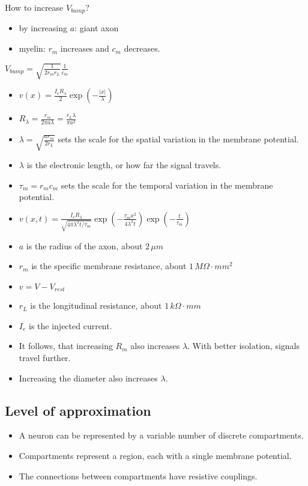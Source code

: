 \documentclass[main]{subfiles}
\begin{document}
How to increase $V_{bump}$?
\begin{itemize}
\item by increasing $a$: giant axon
\item myelin: $r_m$ increases and $c_m$ decreases.
\end{itemize}

$V_{bump} = \sqrt{\frac{1}{2 r_m r_L}} \frac{1}{c_m}$

\begin{itemize}[noitemsep,nolistsep]
	\item $v(x) = \frac{I_eR_\lambda}{2}\exp(-\frac{|x|}{\lambda})$
	\item $R_\lambda=\frac{r_m}{2\pi a\lambda} = \frac{r_L\lambda}{\pi a^2}$
	\item $\lambda = \sqrt{\frac{ar_m}{2r_L}}$ sets the scale for the spatial variation in the membrane potential.
	\item $\lambda$ is the electronic length, or how far the signal travels.
	\item $\tau_m = r_mc_m$ sets the scale for the temporal variation in the membrane potential.
	\item $v(x,t) = \frac{I_eR_\lambda}{\sqrt{4\pi\lambda^2t/\tau_m}}\exp(-\frac{\tau_mx^2}{4\lambda^2t})\exp(-\frac{t}{\tau_m})$
	\item $a$ is the radius of the axon, about $2\,\mu m$
	\item $r_m$ is the specific membrane resistance, about $1\,M\Omega\cdot mm^2$
	\item $v = V - V_{rest}$
	\item $r_L$ is the longitudinal resistance, about $1\,k\Omega\cdot mm$
	\item $I_e$ is the injected current.
	\item It follows, that increasing $R_m$ also increases $\lambda$. With better isolation, signals travel further.
	\item Increasing the diameter also increases $\lambda$.
\end{itemize}

\subsection{Level of approximation}
\begin{itemize}[noitemsep,nolistsep]
	\item A neuron can be represented by a variable number of discrete compartments.
	\item Compartments represent a region, each with a single membrane potential.
	\item The connections between compartments have resistive couplings.
\end{itemize}
\end{document}

